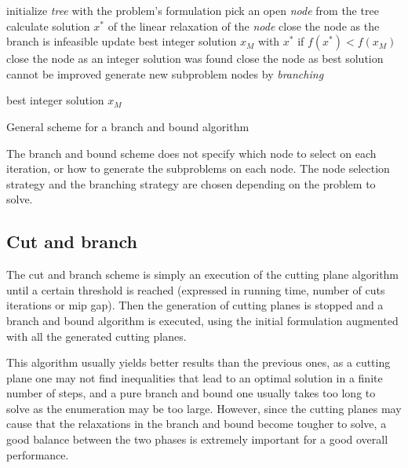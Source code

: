 \begin{algorithm}
\begin{algorithmic}

\STATE initialize \textit{tree} with the problem's formulation
\STATE 
{}
	\STATE pick an open \textit{node} from the tree
	\STATE calculate solution $x^*$ of the linear relaxation of the \textit{node}
		\STATE close the node as the branch is infeasible
		\STATE update best integer solution $x_M$ with $x^*$ if $f(x^*) < f(x_M)$
		\STATE close the node as an integer solution was found
		\STATE close the node as best solution cannot be improved
	\ELSE
		\STATE generate new subproblem nodes by \textit{branching}
	\ENDIF
\ENDWHILE

\RETURN best integer solution $x_M$

\end{algorithmic}

\caption{General scheme for a branch and bound algorithm}
\label{alg:branchnbound}

\end{algorithm}

The branch and bound scheme does not specify which node to select on each iteration, or how to generate the subproblems on each node. The node selection strategy and the branching strategy are chosen depending on the problem to solve.

\subsection{Cut and branch}

The cut and branch scheme is simply an execution of the cutting plane algorithm until a certain threshold is reached (expressed in running time, number of cuts iterations or mip gap). Then the generation of cutting planes is stopped and a branch and bound algorithm is executed, using the initial formulation augmented with all the generated cutting planes.

This algorithm usually yields better results than the previous ones, as a cutting plane one may not find inequalities that lead to an optimal solution in a finite number of steps, and a pure branch and bound one usually takes too long to solve as the enumeration may be too large. However, since the cutting planes may cause that the relaxations in the branch and bound become tougher to solve, a good balance between the two phases is extremely important for a good overall performance.

